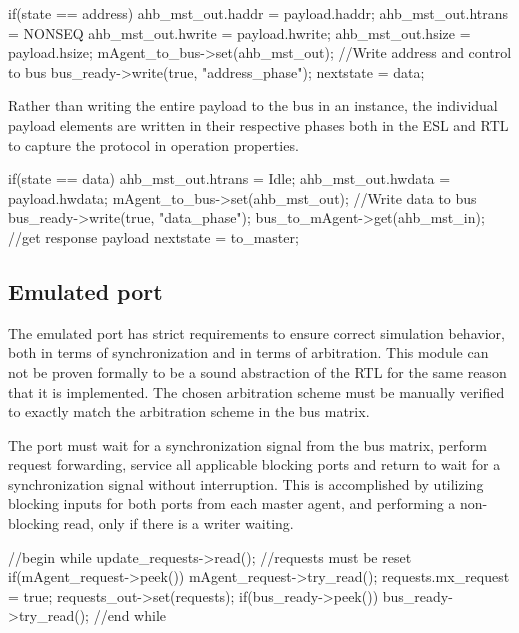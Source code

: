 \begin{C++}
if(state == address){
  ahb_mst_out.haddr = payload.haddr;
  ahb_mst_out.htrans = NONSEQ
  ahb_mst_out.hwrite = payload.hwrite;
  ahb_mst_out.hsize = payload.hsize;
  mAgent_to_bus->set(ahb_mst_out); //Write address and control to bus
  bus_ready->write(true, "address_phase");
  nextstate = data;
}
\end{C++}

Rather than writing the entire payload to the bus in an instance, the individual payload elements are written in their respective phases both in the ESL and RTL to capture the protocol in operation properties. 

\begin{C++}
if(state == data){
 ahb_mst_out.htrans = Idle; 
 ahb_mst_out.hwdata = payload.hwdata;
 mAgent_to_bus->set(ahb_mst_out); //Write data to bus
 bus_ready->write(true, "data_phase");
 bus_to_mAgent->get(ahb_mst_in); //get response payload
 nextstate = to_master;
}
\end{C++}



 
\subsection{Emulated port}
\label{sub:portem}
The emulated port has strict requirements to ensure correct simulation behavior, both in terms of synchronization and in terms of arbitration. This module can not be proven formally to be a sound abstraction of the RTL for the same reason that it is implemented. The chosen arbitration scheme must be manually verified to exactly match the arbitration scheme in the bus matrix. \par 
{}
The port must wait for a synchronization signal from the bus matrix, perform request forwarding, service all applicable blocking ports and return to wait for a synchronization signal without interruption. This is accomplished by utilizing blocking inputs for both ports from each master agent, and performing a non-blocking read, only if there is a writer waiting. 

\begin{C++}
//begin while
update_requests->read(); 
//requests must be reset 
if(mAgent_request->peek()){
mAgent_request->try_read();
requests.mx_request = true;
}
requests_out->set(requests); 
if(bus_ready->peek()) bus_ready->try_read();
//end while
\end{C++}


